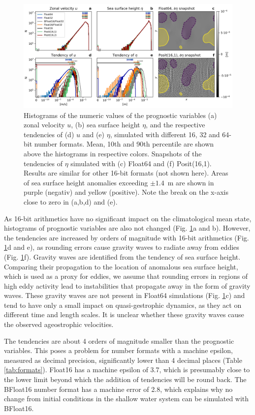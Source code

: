 \documentclass[draft]{agujournal2019}
\begin{document}
\begin{figure}
\includegraphics[width=1\textwidth]{tendency_hist.png}
\caption{Histograms of the numeric values of the prognostic variables (a) zonal velocity $u$, (b) sea surface height $\eta$, and the respective tendencies of (d) $u$ and (e) $\eta$, simulated with different 16, 32 and 64-bit number formats. Mean, 10th and 90th percentile are shown above the histograms in respective colors. Snapshots of the tendencies of $\eta$ simulated with (c) Float64 and (f) Posit(16,1). Results are similar for other 16-bit formats (not shown here). Areas of sea surface height anomalies exceeding $\pm1.4$~m are shown in purple (negativ) and yellow (positive). Note the break on the x-axis close to zero in (a,b,d) and (e).}
\label{fig:tend}
\end{figure}

As 16-bit arithmetics have no significant impact on the climatological mean state, histograms of prognostic variables are also not changed (Fig. \ref{fig:tend}a and b). However, the tendencies are increased by orders of magnitude with 16-bit arithmetics (Fig. \ref{fig:tend}d and e), as rounding errors cause gravity waves to radiate away from eddies (Fig. \ref{fig:tend}f). Gravity waves are identified from the tendency of sea surface height. Comparing their propagation to the location of anomalous sea surface height, which is used as a proxy for eddies, we assume that rounding errors in regions of high eddy activity lead to instabilities that propagate away in the form of gravity waves. These gravity waves are not present in Float64 simulations (Fig. \ref{fig:tend}c) and tend to have only a small impact on quasi-gestrophic dynamics, as they act on different time and length scales. It is unclear whether these gravity waves cause the observed ageostrophic velocities.

The tendencies are about 4 orders of magnitude smaller than the prognostic variables. This poses a problem for number formats with a machine epsilon, measured as decimal precision, significantly lower than 4 decimal places (Table \ref{tab:formats}). Float16 has a machine epsilon of 3.7, which is presumably close to the lower limit beyond which the addition of tendencies will be round back. The BFloat16 number format has a machine error of 2.8, which explains why no change from initial conditions in the shallow water system can be simulated with BFloat16.
\end{document}
